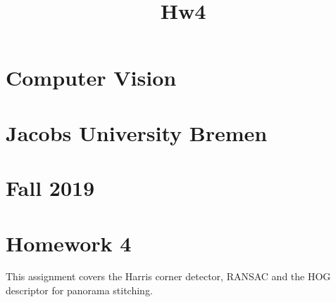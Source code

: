 \documentclass[11pt]{article}
\title{Hw4}
\begin{document}
    
    
    \maketitle
    
    

    
    \hypertarget{computer-vision}{%
\section{Computer Vision}\label{computer-vision}}

\hypertarget{jacobs-university-bremen}{%
\section{Jacobs University Bremen}\label{jacobs-university-bremen}}

\hypertarget{fall-2019}{%
\section{Fall 2019}\label{fall-2019}}

\hypertarget{homework-4}{%
\section{Homework 4}\label{homework-4}}

This assignment covers the Harris corner detector, RANSAC and the HOG
descriptor for panorama stitching.
\end{document}
